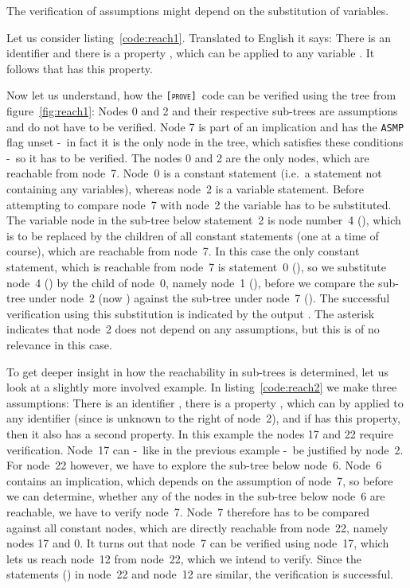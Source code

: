 \documentclass[british]{article}
\newcommand\m[1]{\pcode{\texttt{#1}}}
\newcommand\name{\texttt{\textsc{[prove]}}}
\begin{document}
The verification of assumptions might depend on the substitution of variables.
\newline

Let us consider listing~\ref{code:reach1}. Translated to English it says:
There is an identifier \m{a} and there is a property \m{[b]prop}, which can be
applied to any variable \m{b}. It follows that \m{a} has this property.
\newline

Now let us understand, how the \name\ code can be verified using the tree from
figure~\ref{fig:reach1}: Nodes 0 and 2 and their respective sub-trees are
assumptions and do not have to be verified. Node 7 is part of an implication and
has the \texttt{ASMP} flag unset -\ in fact it is the only node in the tree,
which satisfies these conditions -\ so it has to be verified. The nodes 0 and 2
are the only nodes, which are reachable from node~7. Node~0 is a constant
statement (i.e.\ a statement not containing any variables), whereas node~2 is a
variable statement. Before attempting to compare node~7 with node~2 the variable
has to be substituted. The variable node in the sub-tree below statement~2 is
node number~4 (\m{b}), which is to be replaced by the children of all constant
statements (one at a time of course), which are reachable from node~7. In this
case the only constant statement, which is reachable from node~7 is statement~0
(\m{[a]}), so we substitute node~4 (\m{b}) by the child of node~0, namely node~1
(\m{a}), before we compare the sub-tree under node~2 (now \m{[a]prop}) against
the sub-tree under node~7 (\m{[a]prop}). The successful verification using this
substitution is indicated by the output \m{<7:2(b=0)*>}. The asterisk indicates
that node~2 does not depend on any assumptions, but this is of no relevance in
this case.
\newline

To get deeper insight in how the reachability in sub-trees is determined, let us
look at a slightly more involved example. In listing~\ref{code:reach2} we
make three assumptions: There is an identifier \m{a}, there is a property
\m{[b]prop}, which can by applied to any identifier (since \m{b} is unknown to
the right of node~2), and if \m{a} has this property, then it also has a second
property. In this example the nodes 17 and 22 require verification.  Node~17 can
-\ like in the previous example -\ be justified by node~2.  For node~22 however,
we have to explore the sub-tree below node~6. Node~6 contains an implication,
which depends on the assumption of node~7, so before we can determine, whether
any of the nodes in the sub-tree below node~6 are reachable, we have to verify
node~7.  Node~7 therefore has to be compared against all constant nodes, which
are directly reachable from node~22, namely nodes 17 and 0. It turns out that
node~7 can be verified using node~17, which lets us reach node~12 from node~22,
which we intend to verify. Since the statements (\m{[a]prop2}) in node~22 and
node~12 are similar, the verification is successful.
\end{document}

